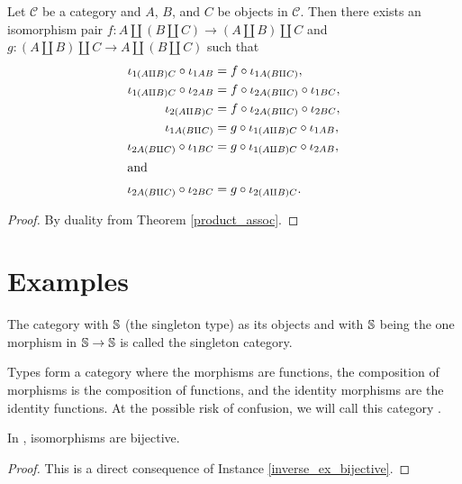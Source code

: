 \documentclass[../math.tex]{subfiles}
\begin{document}
\begin{theorem} \label{coproduct_assoc}
    Let $\mathcal C$ be a category and $A$, $B$, and $C$ be objects in $\mathcal
    C$.  Then there exists an isomorphism pair $f : A \amalg (B \amalg C) \to (A
    \amalg B) \amalg C$ and $g : (A \amalg B) \amalg C \to A \amalg (B \amalg
    C)$ such that
    \begin{align*}
        \iota_{1(A \amalg B)C} \circ \iota_{1AB}
            &= f \circ \iota_{1A(B \amalg C)}, \\
        \iota_{1(A \amalg B)C} \circ \iota_{2AB}
            &= f \circ \iota_{2A(B \amalg C)} \circ \iota_{1BC}, \\
        \iota_{2(A \amalg B)C}
            &= f \circ \iota_{2A(B \amalg C)} \circ \iota_{2BC}, \\
        \iota_{1A(B \amalg C)}
            &= g \circ \iota_{1(A \amalg B)C} \circ \iota_{1AB}, \\
        \iota_{2A(B \amalg C)} \circ \iota_{1BC}
            &= g \circ \iota_{1(A \amalg B)C} \circ \iota_{2AB}, \\
    \intertext{and}
        \iota_{2A(B \amalg C)} \circ \iota_{2BC}
            &= g \circ \iota_{2(A \amalg B)C}.
    \end{align*}
\end{theorem}
\begin{proof}
    By duality from Theorem \ref{product_assoc}.
\end{proof}

\section{Examples}

\begin{definition}
    The category with $\S$ (the singleton type) as its objects and with $\S$
    being the one morphism in $\S \to \S$ is called the singleton category.
\end{definition}

\begin{definition}
    Types form a category where the morphisms are functions, the composition of
    morphisms is the composition of functions, and the identity morphisms are
    the identity functions.  At the possible risk of confusion, we will call
    this category \Type.
\end{definition}

\begin{theorem}
    In \Type, isomorphisms are bijective.
\end{theorem}
\begin{proof}
    This is a direct consequence of Instance \ref{inverse_ex_bijective}.
\end{proof}
\end{document}
